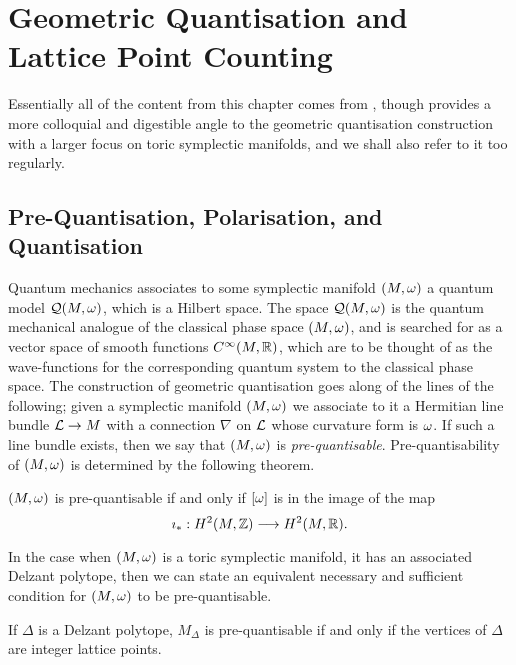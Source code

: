 \chapter{Geometric Quantisation and Lattice Point Counting}

Essentially all of the content from this chapter comes from \cite{GGK02}, though \cite{Gui94} provides a more colloquial and digestible angle to the geometric quantisation construction with a larger focus on toric symplectic manifolds, and we shall also refer to it too regularly.

\section{Pre-Quantisation, Polarisation, and Quantisation}

Quantum mechanics associates to some symplectic manifold $(M,\omega)$ a quantum model $\mathcal{Q}(M,\omega)$, which is a Hilbert space. The space $\mathcal{Q}(M,\omega)$ is the quantum mechanical analogue of the classical phase space $(M,\omega)$, and is searched for as a vector space of smooth functions $C^{\infty}(M,\mathbb{R})$, which are to be thought of as the wave-functions for the corresponding quantum system to the classical phase space. The construction of geometric quantisation goes along of the lines of the following; given a symplectic manifold $(M,\omega)$ we associate to it a Hermitian line bundle $\mathcal{L} \rightarrow M$ with a connection $\nabla$ on $\mathcal{L}$ whose curvature form is $\omega$. If such a line bundle exists, then we say that $(M,\omega)$ is \emph{pre-quantisable}. Pre-quantisability of $(M,\omega)$ is determined by the following theorem.

\begin{thm}
	$(M,\omega)$ is pre-quantisable if and only if $[\omega]$ is in the image of the map
	\begin{equation*}
		\imath_{\ast}:H^{2}(M,\mathbb{Z}) \longrightarrow H^{2}(M,\mathbb{R}).
	\end{equation*}
\end{thm}

In the case when $(M,\omega)$ is a toric symplectic manifold, \ie it has an associated Delzant polytope, then we can state an equivalent necessary and sufficient condition for $(M,\omega)$ to be pre-quantisable.

\begin{thm}
	If $\Delta$ is a Delzant polytope, $M_{\Delta}$ is pre-quantisable if and only if the vertices of $\Delta$ are integer lattice points.
\end{thm}

